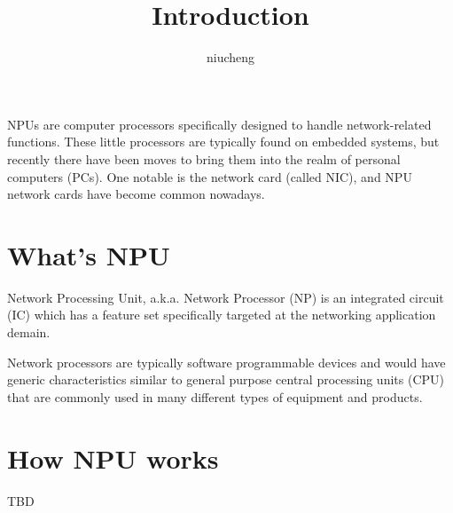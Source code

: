 \documentclass[a4paper,12pt]{article}
\author{niucheng}
\title{Introduction}
\begin{document}
\maketitle
\tableofcontents
\cleardoublepage
NPUs are computer processors specifically designed to handle
 network-related functions. These little processors are typically
 found on embedded systems, but recently there have been moves
 to bring them into the realm of personal computers (PCs). One
 notable is the network card (called NIC), and NPU network cards
 have become common nowadays.
\section{What's NPU}
Network Processing Unit, a.k.a. Network Processor (NP) is an
 integrated circuit (IC) which has a feature set specifically
 targeted at the networking application demain.

Network processors are typically software programmable devices
 and would have generic characteristics similar to general purpose
 central processing units (CPU) that are commonly used in many
 different types of equipment and products.
\section{How NPU works}
TBD
\end{document}
